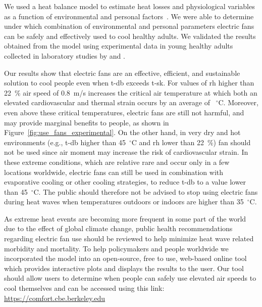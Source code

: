 We used a heat balance model to estimate heat losses and physiological variables as a function of environmental and personal factors~\cite{Gagge1986}.
We were able to determine under which combination of environmental and personal parameters electric fans can be safely and effectively used to cool healthy adults.
We validated the results obtained from the  model using experimental data in young healthy adults collected in laboratory studies by  and .

Our results show that electric fans are an effective, efficient, and sustainable solution to cool people even when \ac{t-db} exceeds \ac{t-sk}.
For values of \ac{rh} higher than 22~\% air speed of 0.8~m/s increases the critical air temperature at which both an elevated cardiovascular and thermal strain occurs by an average of ~$^{\circ}$C\@.
Moreover, even above these critical temperatures, electric fans are still not harmful, and may provide marginal benefits to people, as shown in Figure~\ref{fig:use_fans_experimental}.
On the other hand, in very dry and hot environments (e.g., \ac{t-db} higher than 45~$^{\circ}$C and \ac{rh} lower than 22~\%) fan should not be used since air moment may increase the risk of cardiovascular strain.
In these extreme conditions, which are relative rare and occur only in a few locations worldwide, electric fans can still be used in combination with evaporative cooling or other cooling strategies, to reduce \ac{t-db} to a value lower than 45~$^{\circ}$C\@.
The public should therefore not be advised to stop using electric fans during  heat waves when temperatures outdoors or indoors are higher than 35~$^{\circ}$C\@.

As extreme heat events are becoming more frequent in some part of the world due to the effect of global climate change, public health recommendations regarding electric fan use should be reviewed to help minimize heat wave related morbidity and mortality. 
To help policymakers and people worldwide we incorporated the model into an open-source, free to use, web-based online tool which provides interactive plots and displays the results to the user.
Our tool should allow users to determine when people can safely use elevated air speeds to cool themselves and can be accessed using this link: \url{https://comfort.cbe.berkeley.edu}

